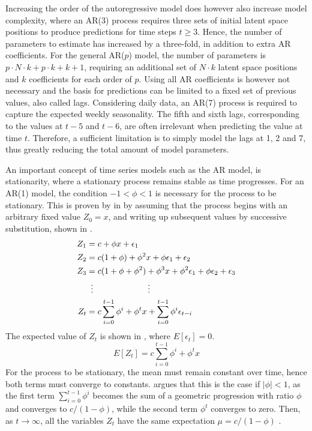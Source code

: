     Increasing the order of the autoregressive model does however also increase model complexity, where an AR(3) process requires three sets of initial latent space positions to produce predictions for time steps $t\geq3$. Hence, the number of parameters to estimate has increased by a three-fold, in addition to extra AR coefficients. For the general AR($p$) model, the number of parameters is $p\cdot N\cdot k + p\cdot k + k + 1$, requiring an additional set of $N\cdot k$ latent space positions and $k$ coefficients for each order of $p$.
    Using all AR coefficients is however not necessary and the basis for predictions can be limited to a fixed set of previous values, also called lags. Considering daily data, an AR(7) process is required to capture the expected weekly seasonality. The fifth and sixth lags, corresponding to the values at $t-5$ and $t-6$, are often irrelevant when predicting the value at time $t$. Therefore, a sufficient limitation is to simply model the lags at 1, 2 and 7, thus greatly reducing the total amount of model parameters.
    
    An important concept of time series models such as the AR model, is stationarity, where a stationary process remains stable as time progresses. For an AR(1) model, the condition $-1<\phi<1$ is necessary for the process to be stationary. This is proven by \citeauthor{alonso2012autoregressive} in \cite{alonso2012autoregressive} by assuming that the process begins with an arbitrary fixed value $Z_0=x$, and writing up subsequent values by successive substitution, shown in .
    \begin{equation}\label{eq:ar-substitution}
        \begin{split}
            Z_1 & = c + \phi x + \epsilon_1 \\
            Z_2 & = c(1+\phi) + \phi^2x+\phi\epsilon_1 + \epsilon_2 \\
            Z_3 & = c(1+\phi+\phi^2) + \phi^3x + \phi^2\epsilon_1 + \phi\epsilon_2 + \epsilon_3 \\
            & \vdotswithin{=}\qquad\qquad\qquad \vdots \\
            Z_t & = c\sum_{i=0}^{t-1}\phi^i + \phi^tx + \sum_{i=0}^{t-1}\phi^i\epsilon_{t-i}
        \end{split}
    \end{equation}
    The expected value of $Z_t$ is shown in , where $E[\epsilon_t]=0$.
    \begin{equation}\label{eq:ar-expectation}
        E[Z_t] = c\sum_{i=0}^{t-1}\phi^i+\phi^tx
    \end{equation}
    For the process to be stationary, the mean must remain constant over time, hence both terms must converge to constants. \citeauthor{alonso2012autoregressive} argues that this is the case if $|\phi|<1$, as the first term $\sum_{i=0}^{t-1}\phi^i$ becomes the sum of a geometric progression with ratio $\phi$ and converges to $c/(1-\phi)$, while the second term $\phi^t$ converges to zero. Then, as $t\rightarrow\infty$, all the variables $Z_t$ have the same expectation $\mu=c/(1-\phi)$ \cite{alonso2012autoregressive}.
    

